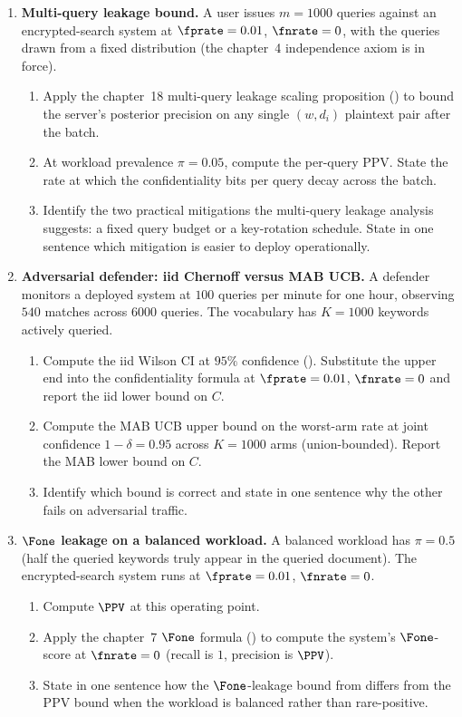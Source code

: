 \begin{enumerate}
\item \exstarstar
\label{ex:ch18-6}
\textbf{Multi-query leakage bound.}
A user issues $m = 1000$ queries against an encrypted-search
system at $\fprate = 0.01$, $\fnrate = 0$, with the queries
drawn from a fixed distribution (the chapter~4 independence
axiom  is in force).
\begin{enumerate}
  \item[(a)] Apply the chapter~18 multi-query leakage scaling
    proposition () to bound the
    server's posterior precision on any single $(w, d_i)$
    plaintext pair after the batch.
  \item[(b)] At workload prevalence $\pi = 0.05$, compute the
    per-query PPV. State the rate at which the
    confidentiality bits per query decay across the batch.
  \item[(c)] Identify the two practical mitigations the
    multi-query leakage analysis suggests: a fixed query
    budget or a key-rotation schedule. State in one sentence
    which mitigation is easier to deploy operationally.
\end{enumerate}

\item \exstarstar
\label{ex:ch18-7}
\textbf{Adversarial defender: iid Chernoff versus MAB UCB.}
A defender monitors a deployed system at $100$ queries per
minute for one hour, observing $540$ matches across $6000$
queries. The vocabulary has $K = 1000$ keywords actively
queried.
\begin{enumerate}
  \item[(a)] Compute the iid Wilson CI at $95\%$ confidence
    (). Substitute the upper
    end into the confidentiality formula at $\fprate = 0.01$,
    $\fnrate = 0$ and report the iid lower bound on $C$.
  \item[(b)] Compute the MAB UCB upper bound on the worst-arm
    rate at joint confidence $1 - \delta = 0.95$ across $K =
    1000$ arms (union-bounded). Report the MAB lower bound on
    $C$.
  \item[(c)] Identify which bound is correct and state in one
    sentence why the other fails on adversarial traffic.
\end{enumerate}

\item \exstarstar
\label{ex:ch18-8}
\textbf{$\Fone$ leakage on a balanced workload.}
A balanced workload has $\pi = 0.5$ (half the queried keywords
truly appear in the queried document). The encrypted-search
system runs at $\fprate = 0.01$, $\fnrate = 0$.
\begin{enumerate}
  \item[(a)] Compute $\PPV$ at this operating point.
  \item[(b)] Apply the chapter~7 $\Fone$ formula
    () to compute the system's $\Fone$-score
    at $\fnrate = 0$ (recall is $1$, precision is $\PPV$).
  \item[(c)] State in one sentence how the $\Fone$-leakage
    bound from  differs from the
    PPV bound when the workload is balanced rather than
    rare-positive.
\end{enumerate}


\end{enumerate}
